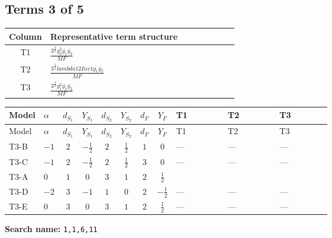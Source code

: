 \documentclass[8pt]{article}
\begin{document}
\begin{landscape}
\subsection*{Terms 3 of 5}
\begin{center}
\begin{tabular}{@{}c >{\raggedright\arraybackslash}p{0.82\linewidth}@{}}
\toprule
Column & Representative term structure \\
\midrule
T1 & \(\displaystyle \frac{3^{\frac{3}{4}} g_{2}^{2} \overline{y_{1}} \overline{y_{2}}}{MF}\) \\
\midrule
T2 & \(\displaystyle \frac{3^{\frac{3}{4}} lambda12Inv1 \overline{y_{1}} \overline{y_{2}}}{MF}\) \\
\midrule
T3 & \(\displaystyle \frac{3^{\frac{3}{4}} g_{1}^{2} \overline{y_{1}} \overline{y_{2}}}{MF}\) \\
\midrule
\bottomrule
\end{tabular}
\end{center}
\smallskip
\tiny
\begin{longtable}{@{}llcccccc >{\raggedright\arraybackslash}p{0.21\linewidth} >{\raggedright\arraybackslash}p{0.21\linewidth} >{\raggedright\arraybackslash}p{0.21\linewidth}@{}}
\toprule
Model & $\alpha$ & $d_{S_1}$ & $Y_{S_1}$ & $d_{S_2}$ & $Y_{S_2}$ & $d_F$ & $Y_F$ & T1 & T2 & T3 \\
\midrule
\endfirsthead
\toprule
Model & $\alpha$ & $d_{S_1}$ & $Y_{S_1}$ & $d_{S_2}$ & $Y_{S_2}$ & $d_F$ & $Y_F$ & T1 & T2 & T3 \\
\midrule
\endhead
T3-B & $-1$ & $2$ & $-\frac{1}{2}$ & $2$ & $\frac{1}{2}$ & $1$ & $0$ & --- & --- & --- \\
\midrule
T3-C & $-1$ & $2$ & $-\frac{1}{2}$ & $2$ & $\frac{1}{2}$ & $3$ & $0$ & --- & --- & --- \\
\midrule
T3-A & $0$ & $1$ & $0$ & $3$ & $1$ & $2$ & $\frac{1}{2}$ & \scriptsize\adjustbox{max width=\linewidth}{$\begin{gathered} - \frac{17 \cdot 3^{\frac{3}{4}} g_{2}^{2} \overline{y_{1}} \overline{y_{2}}}{24 MF}\end{gathered}$} & \scriptsize\adjustbox{max width=\linewidth}{$\begin{gathered} - \frac{3^{\frac{3}{4}} lambda12Inv1 \overline{y_{1}} \overline{y_{2}}}{6 MF}\end{gathered}$} & \scriptsize\adjustbox{max width=\linewidth}{$\begin{gathered} - \frac{3^{\frac{3}{4}} g_{1}^{2} \overline{y_{1}} \overline{y_{2}}}{8 MF}\end{gathered}$} \\
\midrule
T3-D & $-2$ & $3$ & $-1$ & $1$ & $0$ & $2$ & $-\frac{1}{2}$ & --- & --- & --- \\
\midrule
T3-E & $0$ & $3$ & $0$ & $3$ & $1$ & $2$ & $\frac{1}{2}$ & --- & --- & --- \\
\midrule
\bottomrule
\end{longtable}
\clearpage
\noindent\textbf{Search name: }\texttt{1,1,6,11}\par\smallskip

\end{landscape}
\end{document}
